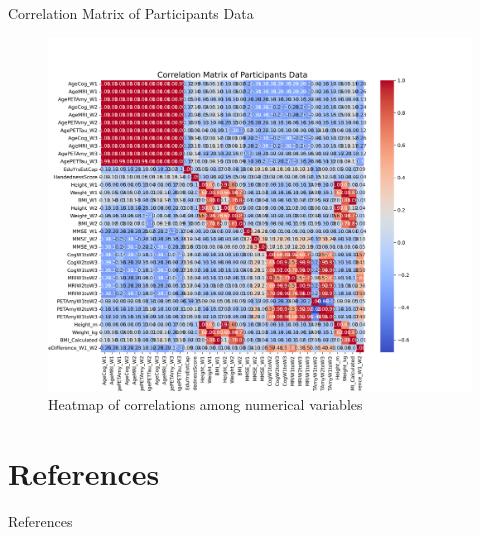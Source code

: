 \documentclass{beamer}
\begin{document}
\begin{frame}{Correlation Matrix of Participants Data}
  \begin{figure}
    \centering
    \includegraphics[height=0.8\textheight]{correlation_matrix.png}
    \caption{Heatmap of correlations among numerical variables}
  \end{figure}
\end{frame}

\section{References}
\begin{frame}[allowframebreaks]{References}
  
  
\end{frame}
\end{document}
